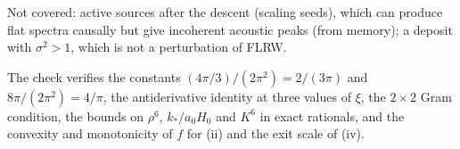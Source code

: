 Not covered: active sources after the descent (scaling seeds), which can produce flat spectra causally but give incoherent acoustic peaks (from memory); a deposit with $\sigma^{2} > 1$, which is not a perturbation of FLRW.

The check verifies the constants $(4\pi/3)/(2\pi^{2}) = 2/(3\pi)$ and $8\pi/(2\pi^{2}) = 4/\pi$, the antiderivative identity at three values of $\xi$, the $2 \times 2$ Gram condition, the bounds on $\rho^{6}$, $k_{*}/a_{0}H_{0}$ and $K^{6}$ in exact rationals, and the convexity and monotonicity of $f$ for (ii) and the exit scale of (iv).
